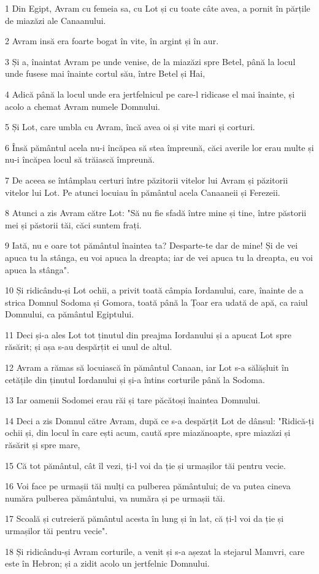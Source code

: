 \par 1 Din Egipt, Avram cu femeia sa, cu Lot și cu toate câte avea, a pornit în părțile de miazăzi ale Canaanului.
\par 2 Avram insă era foarte bogat în vite, în argint și în aur.
\par 3 Și a, înaintat Avram pe unde venise, de la miazăzi spre Betel, până la locul unde fusese mai înainte cortul său, între Betel și Hai,
\par 4 Adică până la locul unde era jertfelnicul pe care-l ridicase el mai înainte, și acolo a chemat Avram numele Domnului.
\par 5 Și Lot, care umbla cu Avram, încă avea oi și vite mari și corturi.
\par 6 Însă pământul acela nu-i încăpea să stea împreună, căci averile lor erau multe și nu-i încăpea locul să trăiască împreună.
\par 7 De aceea se întâmplau certuri între păzitorii vitelor lui Avram și păzitorii vitelor lui Lot. Pe atunci locuiau în pământul acela Canaaneii și Ferezeii.
\par 8 Atunci a zis Avram către Lot: "Să nu fie sfadă între mine și tine, între păstorii mei și păstorii tăi, căci suntem frați.
\par 9 Iată, nu e oare tot pământul înaintea ta? Desparte-te dar de mine! Și de vei apuca tu la stânga, eu voi apuca la dreapta; iar de vei apuca tu la dreapta, eu voi apuca la stânga".
\par 10 Și ridicându-și Lot ochii, a privit toată câmpia Iordanului, care, înainte de a strica Domnul Sodoma și Gomora, toată până la Țoar era udată de apă, ca raiul Domnului, ca pământul Egiptului.
\par 11 Deci și-a ales Lot tot ținutul din preajma Iordanului și a apucat Lot spre răsărit; și așa s-au despărțit ei unul de altul.
\par 12 Avram a rămas să locuiască în pământul Canaan, iar Lot s-a sălășluit în cetățile din ținutul Iordanului și și-a întins corturile până la Sodoma.
\par 13 Iar oamenii Sodomei erau răi și tare păcătoși înaintea Domnului.
\par 14 Deci a zis Domnul către Avram, după ce s-a despărțit Lot de dânsul: "Ridică-ți ochii și, din locul în care ești acum, caută spre miazănoapte, spre miazăzi și răsărit și spre mare,
\par 15 Că tot pământul, cât îl vezi, ți-l voi da ție și urmașilor tăi pentru vecie.
\par 16 Voi face pe urmașii tăi mulți ca pulberea pământului; de va putea cineva număra pulberea pământului, va număra și pe urmașii tăi.
\par 17 Scoală și cutreieră pământul acesta în lung și în lat, că ți-l voi da ție și urmașilor tăi pentru vecie".
\par 18 Și ridicându-și Avram corturile, a venit și s-a așezat la stejarul Mamvri, care este în Hebron; și a zidit acolo un jertfelnic Domnului.

